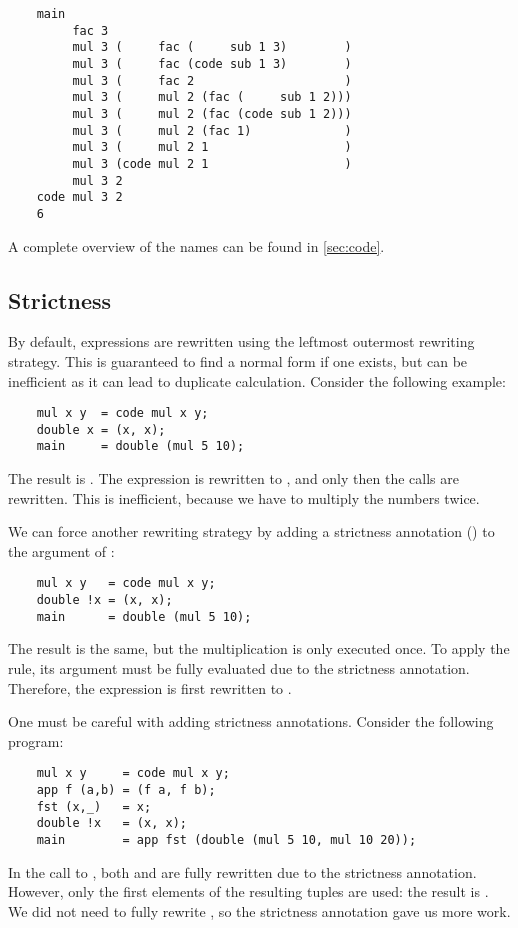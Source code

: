 \begin{lstlisting}
	main
	     fac 3
	     mul 3 (     fac (     sub 1 3)        )
	     mul 3 (     fac (code sub 1 3)        )
	     mul 3 (     fac 2                     )
	     mul 3 (     mul 2 (fac (     sub 1 2)))
	     mul 3 (     mul 2 (fac (code sub 1 2)))
	     mul 3 (     mul 2 (fac 1)             )
	     mul 3 (     mul 2 1                   )
	     mul 3 (code mul 2 1                   )
	     mul 3 2
	code mul 3 2
	6
\end{lstlisting}

A complete overview of the  names can be found in
\autoref{sec:code}.

\subsection{Strictness}
\label{sec:examples:strictness}

By default, expressions are rewritten using the leftmost outermost rewriting
strategy. This is guaranteed to find a normal form if one exists, but can be
inefficient as it can lead to duplicate calculation. Consider the following
example:

\begin{lstlisting}
	mul x y  = code mul x y;
	double x = (x, x);
	main     = double (mul 5 10);
\end{lstlisting}

The result is . The expression is rewritten to , and only then the  calls are rewritten. This is
inefficient, because we have to multiply the numbers twice.

We can force another rewriting strategy by adding a strictness annotation
(\fuspel{!}) to the argument of :

\begin{lstlisting}
	mul x y   = code mul x y;
	double !x = (x, x);
	main      = double (mul 5 10);
\end{lstlisting}

The result is the same, but the multiplication is only executed once. To apply
the  rule, its argument must be fully evaluated due to the
strictness annotation. Therefore, the expression is first rewritten to
.

One must be careful with adding strictness annotations. Consider the following
program:

\begin{lstlisting}
	mul x y     = code mul x y;
	app f (a,b) = (f a, f b);
	fst (x,_)   = x;
	double !x   = (x, x);
	main        = app fst (double (mul 5 10, mul 10 20));
\end{lstlisting}

In the call to , both  and 
are fully rewritten due to the strictness annotation. However, only the first
elements of the resulting tuples are used: the result is . We
did not need to fully rewrite , so the strictness annotation
gave us more work.
